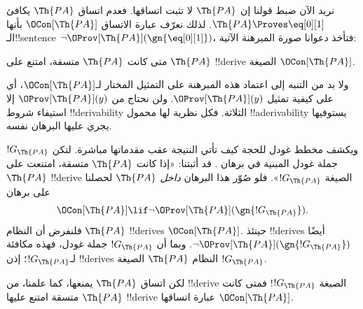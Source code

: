 \documentclass[../../../include/open-logic-section]{subfiles}
\begin{document}


نريد الآن ضبط قولنا إن $\Th{PA}$ لا تثبت اتساقها.
فعدم اتساق $\Th{PA}$ يكافئ $\Th{PA} \Proves \eq[0][1]$.
لذلك نعرّف عبارة الاتساق $\OCon[\Th{PA}]$ بأنها
الـ!!{sentence} $\lnot
\OProv[\Th{PA}](\gn{\eq[0][1]})$، فتأخذ دعوانا صورة المبرهنة
الآتية:

\begin{thm}
متى كانت $\Th{PA}$ متسقة، امتنع على $\Th{PA}$ !!{derive}
الصيغة $\OCon[\Th{PA}]$.
\end{thm}

ولا بد من التنبه إلى اعتماد هذه المبرهنة على التمثيل المختار
لـ$\OCon[\Th{PA}]$، أي على كيفية تمثيل $\OProv[\Th{PA}](y)$.
ولن نحتاج من $\OProv[\Th{PA}](y)$ إلا استيفاء شروط
!!{derivability} الثلاثة. فكل نظرية لها محمول
!!a{derivability} يستوفيها يجري عليها البرهان نفسه.

ويكشف مخطط غودل للحجة كيف تأتي النتيجة عقب مقدماتها مباشرة.
لتكن $!G_\Th{PA}$ جملة غودل المبنية في برهان
. قد أثبتنا: «إذا كانت
$\Th{PA}$ متسقة، امتنعت على $\Th{PA}$ !!{derive} الصيغة
$!G_\Th{PA}$». فلو صُوّر هذا البرهان \emph{داخل} $\Th{PA}$
لحصلنا على برهان
\[
\OCon[\Th{PA}] \lif \lnot \OProv[\Th{PA}](\gn{!G_\Th{PA}}).
\]
فلنفرض أن النظام $\Th{PA}$ !!{derive}s $\OCon[\Th{PA}]$.
حينئذ !!{derive}s أيضًا $\lnot \OProv[\Th{PA}](\gn{!G_\Th{PA}})$.
وبما أن $!G_\Th{PA}$ جملة غودل، فهذه مكافئة لـ$!G_\Th{PA}$؛
إذن !!{derive}s النظام $\Th{PA}$ الصيغة $!G_\Th{PA}$.

لكن اتساق $\Th{PA}$ يمنعها، كما علمنا، من !!{derive}
الصيغة $!G_\Th{PA}$!{} فمتى كانت $\Th{PA}$ متسقة امتنع
عليها !!{derive} عبارة اتساقها $\OCon[\Th{PA}]$.
\end{document}
